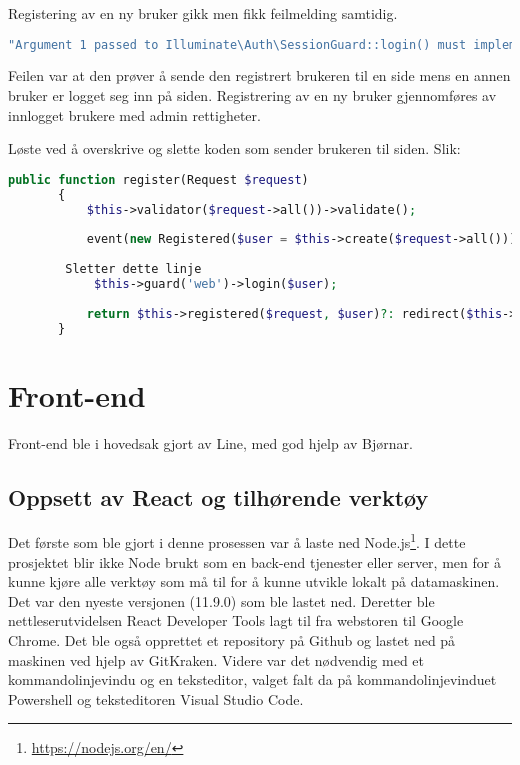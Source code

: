 Registering av en ny bruker gikk men fikk feilmelding samtidig.
\begin{lstlisting}[language=PHP]
   "Argument 1 passed to Illuminate\Auth\SessionGuard::login() must implement interface Illuminate\Contracts\Auth\Authenticatable, null given,
\end{lstlisting}

Feilen var at den prøver å sende den registrert brukeren til en side mens en annen  bruker er logget seg inn på siden. Registrering av en ny bruker gjennomføres av innlogget brukere med admin rettigheter.

Løste ved å overskrive og slette koden som sender brukeren til siden. Slik:
\begin{lstlisting}[language=PHP]
   public function register(Request $request)
       {
           $this->validator($request->all())->validate();
    
           event(new Registered($user = $this->create($request->all())));
    
        Sletter dette linje
            $this->guard('web')->login($user);
    
           return $this->registered($request, $user)?: redirect($this->redirectPath());
       }
\end{lstlisting}
  
\cite{spatie2019aupar}  
\clearpage





\section{Front-end}
Front-end ble i hovedsak gjort av Line, med god hjelp av Bjørnar. 

\subsection{Oppsett av React og tilhørende verktøy}

Det første som ble gjort i denne prosessen var å laste ned Node.js\footnote{\url{https://nodejs.org/en/}}. I dette prosjektet blir ikke Node brukt som en back-end tjenester eller server, men for å kunne kjøre alle verktøy som må til for å kunne utvikle lokalt på datamaskinen. Det var den nyeste versjonen (11.9.0) som ble lastet ned. Deretter ble nettleserutvidelsen React Developer Tools lagt til fra  webstoren til Google Chrome. Det ble også opprettet et repository på Github og lastet ned på maskinen ved hjelp av GitKraken. 
Videre var det nødvendig med et kommandolinjevindu og en teksteditor, valget falt da på kommandolinjevinduet Powershell og teksteditoren Visual Studio Code.

